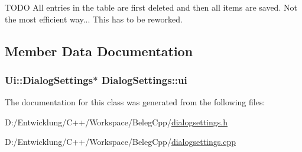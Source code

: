 T\+O\+D\+O All entries in the table are first deleted and then all items are saved. Not the most efficient way... This has to be reworked. 

\subsection{Member Data Documentation}
\hypertarget{class_dialog_settings_a5b53d91a27cdf68f77e4bdd10b6a9bba}{
\subsubsection[{ui}]{\setlength{\rightskip}{0pt plus 5cm}Ui\+::\+Dialog\+Settings$\ast$ Dialog\+Settings\+::ui\hspace{0.3cm}{\ttfamily [private]}}}\label{class_dialog_settings_a5b53d91a27cdf68f77e4bdd10b6a9bba}


The documentation for this class was generated from the following files\+:\begin{DoxyCompactItemize}
\item 
D\+:/\+Entwicklung/\+C++/\+Workspace/\+Beleg\+Cpp/\hyperlink{dialogsettings_8h}{dialogsettings.\+h}\item 
D\+:/\+Entwicklung/\+C++/\+Workspace/\+Beleg\+Cpp/\hyperlink{dialogsettings_8cpp}{dialogsettings.\+cpp}\end{DoxyCompactItemize}
